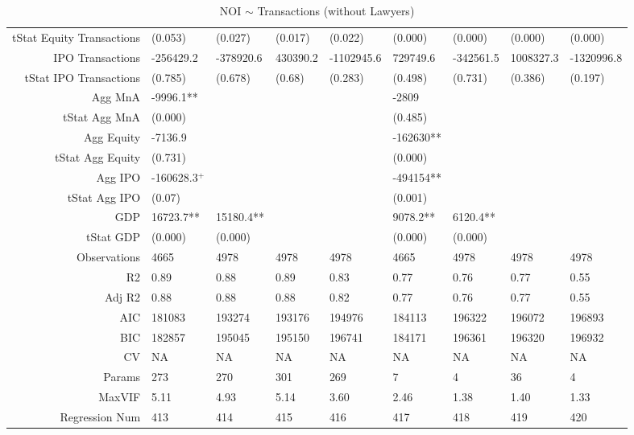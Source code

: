 \begin{table}[ht]
\begin{tabular}{rllllllll}
  tStat Equity Transactions & (0.053) & (0.027) & (0.017) & (0.022) & (0.000) & (0.000) & (0.000) & (0.000) \\ 
  IPO Transactions & -256429.2 & -378920.6 & 430390.2 & -1102945.6 & 729749.6 & -342561.5 & 1008327.3 & -1320996.8 \\ 
  tStat IPO Transactions & (0.785) & (0.678) & (0.68) & (0.283) & (0.498) & (0.731) & (0.386) & (0.197) \\ 
  Agg MnA & -9996.1** &  &  &  & -2809 &  &  &  \\ 
  tStat Agg MnA & (0.000) &  &  &  & (0.485) &  &  &  \\ 
  Agg Equity & -7136.9 &  &  &  & -162630** &  &  &  \\ 
  tStat Agg Equity & (0.731) &  &  &  & (0.000) &  &  &  \\ 
  Agg IPO & -160628.3$^{+}$ &  &  &  & -494154** &  &  &  \\ 
  tStat Agg IPO & (0.07) &  &  &  & (0.001) &  &  &  \\ 
  GDP & 16723.7** & 15180.4** &  &  & 9078.2** & 6120.4** &  &  \\ 
  tStat GDP & (0.000) & (0.000) &  &  & (0.000) & (0.000) &  &  \\ 
  Observations & 4665 & 4978 & 4978 & 4978 & 4665 & 4978 & 4978 & 4978 \\ 
  R2 & 0.89 & 0.88 & 0.89 & 0.83 & 0.77 & 0.76 & 0.77 & 0.55 \\ 
  Adj R2 & 0.88 & 0.88 & 0.88 & 0.82 & 0.77 & 0.76 & 0.77 & 0.55 \\ 
  AIC & 181083 & 193274 & 193176 & 194976 & 184113 & 196322 & 196072 & 196893 \\ 
  BIC & 182857 & 195045 & 195150 & 196741 & 184171 & 196361 & 196320 & 196932 \\ 
  CV & NA & NA & NA & NA & NA & NA & NA & NA \\ 
  Params & 273 & 270 & 301 & 269 & 7 & 4 & 36 & 4 \\ 
  MaxVIF & 5.11 & 4.93 & 5.14 & 3.60 & 2.46 & 1.38 & 1.40 & 1.33 \\ 
  Regression Num & 413 & 414 & 415 & 416 & 417 & 418 & 419 & 420 \\ 
   \hline
\end{tabular}
\caption{NOI $\sim$ Transactions (without Lawyers)} 
\end{table}
